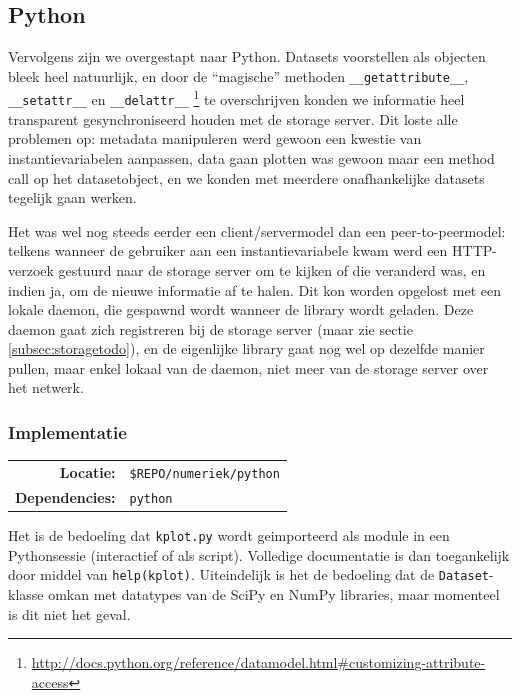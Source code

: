 \documentclass[a4paper]{article}
\begin{document}
\subsection{Python}
\label{subsec:python}

Vervolgens zijn we overgestapt naar Python. Datasets voorstellen als objecten
bleek heel natuurlijk, en door de ``magische'' methoden
{\tt \_\_getattribute\_\_}, {\tt \_\_setattr\_\_} en {\tt \_\_delattr\_\_}
\footnote{\url{http://docs.python.org/reference/datamodel.html#customizing-attribute-access}}
te overschrijven konden we informatie heel transparent gesynchroniseerd houden
met de storage server. Dit loste alle problemen op: metadata manipuleren werd
gewoon een kwestie van instantievariabelen aanpassen, data gaan plotten was
gewoon maar een method call op het datasetobject, en we konden met meerdere
onafhankelijke datasets tegelijk gaan werken.

Het was wel nog steeds eerder een client/servermodel dan een peer-to-peermodel:
telkens wanneer de gebruiker aan een instantievariabele kwam werd een
\gls{HTTP}-verzoek gestuurd naar de storage server om te kijken of die
veranderd was, en indien ja, om de nieuwe informatie af te halen. Dit kon
worden opgelost met een lokale daemon, die gespawnd wordt wanneer de library
wordt geladen. Deze daemon gaat zich registreren bij de storage server (maar
zie sectie \ref{subsec:storagetodo}), en de eigenlijke library gaat nog wel op
dezelfde manier pullen, maar enkel lokaal van de daemon, niet meer van de
storage server over het netwerk.

\subsubsection{Implementatie}

\begin{tabular}{rl}
    {\bf Locatie:}      & {\tt \$REPO/numeriek/python} \\
    {\bf Dependencies:} & {\tt python}
\end{tabular}

\vspace{.05in}

Het is de bedoeling dat {\tt kplot.py} wordt geimporteerd als module in een
Pythonsessie (interactief of als script). Volledige documentatie is dan
toegankelijk door middel van {\tt help(kplot)}. Uiteindelijk is het de
bedoeling dat de {\tt Dataset}-klasse omkan met datatypes van de SciPy en
NumPy libraries, maar momenteel is dit niet het geval.
\end{document}
